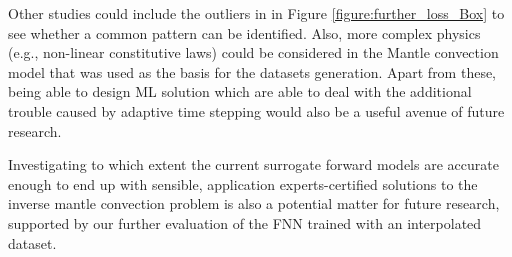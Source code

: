 Other studies could include the outliers in in Figure \ref{figure:further_loss_Box} to see whether a common pattern can be identified. Also, more complex physics (e.g., non-linear constitutive laws) could be considered in the Mantle convection model that was used as the basis for the datasets generation. Apart from these, being able to design ML solution which are able to deal with the additional trouble caused by adaptive time stepping would also be a useful avenue of future research.

Investigating to which extent the current surrogate forward models are accurate enough to end up with sensible, application experts-certified solutions to the inverse mantle convection problem is also a potential matter for future research, supported by our further evaluation of the FNN trained with an interpolated dataset.